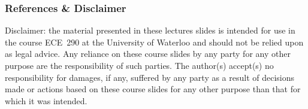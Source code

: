 \begin{frame}
\frametitle{References \& Disclaimer}



\vfill

{\tiny Disclaimer: the material presented in these lectures slides is intended for use in the course ECE~290 at the University of Waterloo and should not be relied upon as legal advice. Any reliance on these course slides by any party for any other purpose are the responsibility of such parties.  The author(s) accept(s) no responsibility for damages, if any, suffered by any party as a result of decisions made or actions based on these course slides for any other purpose than that for which it was intended.\par}


\end{frame}

